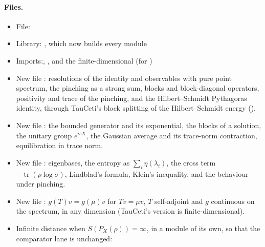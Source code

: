 \documentclass[11pt]{article}
\begin{document}
\paragraph{Files.}\leavevmode
\begin{itemize}
\item File: 
\item Library: , which now builds every module
\item Imports:\newline {},\newline
  ,\newline
  and the finite-dimensional  (for )
\item New file : resolutions of the
  identity and observables with pure point spectrum, the pinching as a strong sum, blocks and
  block-diagonal operators, positivity and trace of the pinching, and the Hilbert--Schmidt
  Pythagoras identity, through TauCeti's block splitting of the Hilbert--Schmidt energy
  ().
\item New file : the bounded generator and
  its exponential, the blocks of a solution, the unitary group $e^{isX}$, the Gaussian average and
  its trace-norm contraction, equilibration in trace norm.
\item New file : eigenbases,
  the entropy as $\sum_i\eta(\lambda_i)$, the cross term $-\operatorname{tr}(\rho\log\sigma)$,
  Lindblad's formula, Klein's inequality, and the behaviour under pinching.
\item New file :
  $g(T)v = g(\mu)v$ for $Tv = \mu v$, $T$ self-adjoint and $g$ continuous on the spectrum, in any
  dimension (TauCeti's version is finite-dimensional).
\item Infinite distance when $S(P_X(\rho)) = \infty$, in a module of its own, so that the
  comparator lane is unchanged:\newline
  \newline

\end{itemize}
\end{document}
